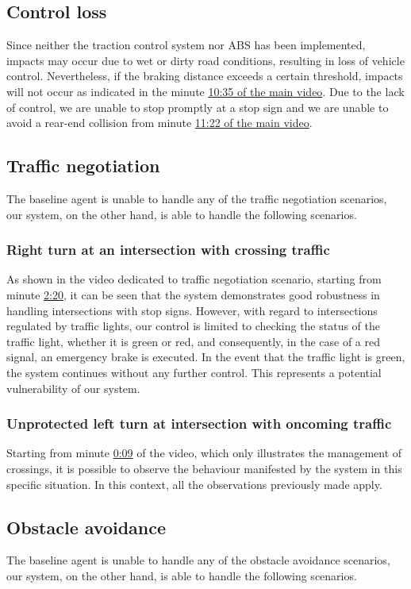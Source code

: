 \documentclass{article}
\begin{document}
\subsection{Control loss}\label{controlLoss}
Since neither the traction control system nor ABS has been implemented, impacts may occur due to wet or dirty road conditions,
resulting in loss of vehicle control. Nevertheless, if the braking distance exceeds a certain threshold, impacts will not occur as
indicated in the minute \href{https://youtu.be/RBGWd_so80U?t=635}{10:35 of the main video}. Due to the lack of control, we are unable to stop promptly at a stop sign and we are unable to avoid a rear-end collision from minute \href{https://youtu.be/RBGWd_so80U?t=682}{11:22 of the main video}.

\subsection{Traffic negotiation}
The baseline agent is unable to handle any of the traffic negotiation scenarios, our system, on the other hand, is able to handle the following scenarios.
\subsubsection{Right turn at an intersection with crossing traffic}
As shown in the video dedicated to traffic negotiation scenario, starting from minute \href{https://youtu.be/d2ESc0bXmmg?t=140}{2:20}, it can be seen that the system demonstrates good robustness in handling intersections with stop signs. However,
with regard to intersections regulated by traffic lights, our control is limited to checking the status of the traffic light, whether it is green or red, and
consequently, in the case of a red signal, an emergency brake is executed. In the event that the traffic light is green, the system continues without any
further control. This represents a potential vulnerability of our system.
\subsubsection{Unprotected left turn at intersection with oncoming traffic}
Starting from minute \href{https://youtu.be/d2ESc0bXmmg?t=9}{0:09} of the video, which only illustrates the management of crossings, it is possible to observe the behaviour manifested by the system in
this specific situation. In this context, all the observations previously made apply.

\subsection{Obstacle avoidance}
The baseline agent is unable to handle any of the obstacle avoidance scenarios, our system, on the other hand, is able to handle the following scenarios.
\end{document}
